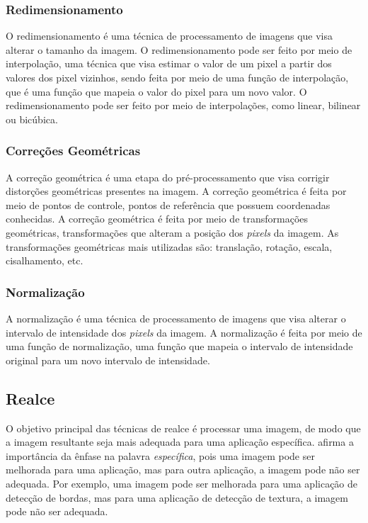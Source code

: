\documentclass[conference]{IEEEtran}
\begin{document}
\subsubsection{Redimensionamento}
O redimensionamento é uma técnica de processamento de imagens que visa alterar o tamanho da imagem. 
O redimensionamento pode ser feito por meio de interpolação, uma técnica que visa estimar o valor de um pixel 
a partir dos valores dos pixel vizinhos, sendo feita por meio de uma função de interpolação, 
que é uma função que mapeia o valor do pixel para um novo valor. 
O redimensionamento pode ser feito por meio de interpolações, como linear, bilinear ou bicúbica.

\subsubsection{Correções Geométricas}
A correção geométrica é uma etapa do pré-processamento que visa corrigir distorções geométricas presentes na imagem. 
A correção geométrica é feita por meio de pontos de controle, pontos de referência que possuem coordenadas 
conhecidas. A correção geométrica é feita por meio de transformações geométricas, transformações que alteram a 
posição dos \emph{pixels} da imagem. As transformações geométricas mais utilizadas são: translação, rotação, escala,
cisalhamento, etc.

\subsubsection{Normalização}
A normalização é uma técnica de processamento de imagens que visa alterar o intervalo de intensidade 
dos \emph{pixels} da imagem. A normalização é feita por meio de uma função de normalização, 
uma função que mapeia o intervalo de intensidade original para um novo intervalo de intensidade.

\subsection{Realce}

O objetivo principal das técnicas de realce é processar uma imagem, de modo que a imagem resultante seja mais 
adequada para uma aplicação específica. \cite{gonzalez2000} afirma a importância da ênfase na palavra 
\emph{específica}, pois uma imagem pode ser melhorada para uma aplicação, mas para outra aplicação, 
a imagem pode não ser adequada. Por exemplo, uma imagem pode ser melhorada para uma aplicação de detecção de bordas, 
mas para uma aplicação de detecção de textura, a imagem pode não ser adequada. 
\end{document}

